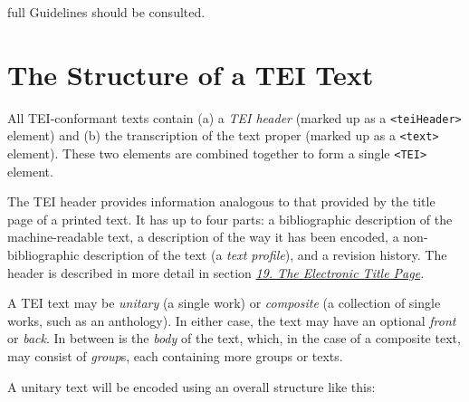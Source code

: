 \documentclass[11pt,twoside]{article}\makeatletter
\makeatletter
\renewcommand\section{\@startsection {section}{1}{\z@}%
     {-1.75ex \@plus -0.5ex \@minus -.2ex}%
     {0.5ex \@plus .2ex}%
     {\reset@font\Large\bfseries\sffamily}}
\def\DivI{\section}
\def\DivI{\chapter}
\makeatother
\begin{document}
full Guidelines should be consulted.
\DivI[The Structure of a TEI Text]{The Structure of a TEI Text}\label{U5-struc}\par All TEI-conformant texts contain (a) a \emph{TEI header}
(marked up as a \texttt{<teiHeader>} element) and (b) the transcription
of the text proper (marked up as a \texttt{<text>} element). These two
elements are combined together to form a single \texttt{<TEI>} element. 
\par The TEI header provides information analogous to that provided by
the title page of a printed text.  It has up to four parts: a
bibliographic description of the machine-readable text, a description
of the way it has been encoded, a non-bibliographic description of the
text (a \emph{text profile}), and a revision history. The
header is described in more detail in section \textit{\hyperref[U5-header]{19. The Electronic Title Page}}.\par A TEI text may be \emph{unitary} (a single work) or
\emph{composite} (a collection of single works, such as an
anthology). In either case, the text may have an optional \emph{front}
or \emph{back}. In between is the \emph{body} of the
text, which, in the case of a composite text, may consist of
\emph{group}s, each containing more groups or texts.\par A unitary text will be encoded using an overall structure like
this:
\end{document}
